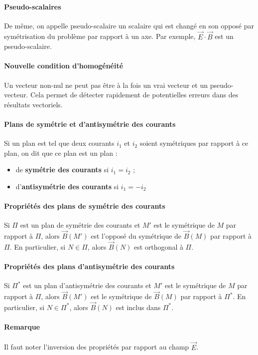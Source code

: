 \documentclass[french]{book}
\theoremstyle{plain}
\theoremstyle{definition}
\theoremstyle{remark}
\newcommand{\st}{^*}
\begin{document}
\paragraph{Pseudo-scalaires} De même, on appelle pseudo-scalaire un scalaire qui est changé en son opposé par symétrisation du problème par rapport à un axe. Par exemple, $\overrightarrow{E}\cdot\overrightarrow{B}$ est un pseudo-scalaire.
\paragraph{Nouvelle condition d'homogénéité} Un vecteur non-nul ne peut pas être à la fois un vrai vecteur et un pseudo-vecteur. Cela permet de détecter rapidement de potentielles erreurs dans des résultats vectoriels.
\paragraph{Plans de symétrie et d'antisymétrie des courants} Si un plan est tel que deux courants $i_1$ et $i_2$ soient symétriques par rapport à ce plan, on dit que ce plan est un plan :
\begin{itemize}
	\item de \textbf{symétrie des courants} si $i_1=i_2$ ;
	\item d'\textbf{antisymétrie des courants} si $i_1=-i_2$
\end{itemize}
\paragraph{Propriétés des plans de symétrie des courants} Si $\Pi$ est un plan de symétrie des courants et $M'$ est le symétrique de $M$ par rapport à $\Pi$, alors $\overrightarrow{B}(M')$ est l'opposé du symétrique de $\overrightarrow{B}(M)$ par rapport à $\Pi$. En particulier, si $N\in\Pi$, alors $\overrightarrow{B}(N)$ est orthogonal à $\Pi$.
\paragraph{Propriétés des plans d'antisymétrie des courants} Si $\Pi\st$ est un plan d'antisymétrie des courants et $M'$ est le symétrique de $M$ par rapport à $\Pi$, alors $\overrightarrow{B}(M')$ est le symétrique de $\overrightarrow{B}(M)$ par rapport à $\Pi\st$. En particulier, si $N\in\Pi\st$, alors $\overrightarrow{B}(N)$ est inclus dans $\Pi\st$.
\paragraph{Remarque} Il faut noter l'inversion des propriétés par rapport au champ $\overrightarrow{E}$.
\end{document}
